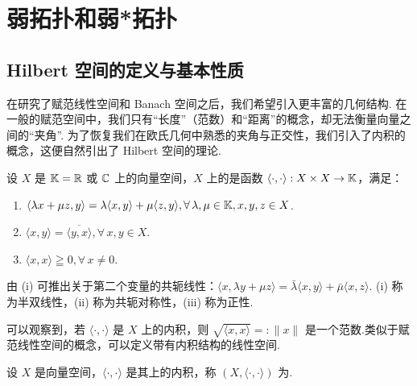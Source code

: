 

\chapter{弱拓扑和弱*拓扑}



\vspace{-2 em}
\section{Hilbert 空间的定义与基本性质}

在研究了赋范线性空间和 Banach 空间之后，我们希望引入更丰富的几何结构.
在一般的赋范空间中，我们只有“长度”（范数）和“距离”的概念，却无法衡量向量之间的“夹角”.
为了恢复我们在欧氏几何中熟悉的夹角与正交性，我们引入了内积的概念，这便自然引出了 Hilbert 空间的理论.

\begin{definition}[内积]
    设 $X$ 是 $\mathbb{K} = \mathbb{R}$ 或 $\mathbb{C}$ 上的向量空间，$X$ 上的是函数 $\langle \cdot, \cdot \rangle: X \times X \to \mathbb{K}$，满足：
    \begin{enumerate}
        \item[(i)] $\langle \lambda x + \mu z, y \rangle = \lambda \langle x, y \rangle + \mu \langle z, y \rangle, \forall\, \lambda, \mu \in \mathbb{K}, x, y, z \in X$.
        \item[(ii)] $\langle x, y \rangle = \overline{\langle y, x \rangle}, \forall\, x, y \in X$.
        \item[(iii)] $\langle x, x \rangle \geqq 0, \forall\, x \neq 0$.
    \end{enumerate}
\end{definition}

由 (i) 可推出关于第二个变量的共轭线性：$\langle x, \lambda y + \mu z \rangle = \bar{\lambda} \langle x, y \rangle + \bar{\mu} \langle x, z \rangle$.
(i) 称为半双线性，(ii) 称为共轭对称性，(iii) 称为正性.\par
可以观察到，若 $\langle \cdot, \cdot \rangle$ 是 $X$ 上的内积，则 $\sqrt{\langle x, x \rangle} =: \|x\|$ 是一个范数.类似于赋范线性空间的概念，可以定义带有内积结构的线性空间.

\begin{definition}[内积空间]
    设 $X$ 是向量空间，$\langle \cdot, \cdot \rangle$ 是其上的内积，称 $(X, \langle \cdot, \cdot \rangle)$ 为.
\end{definition}

